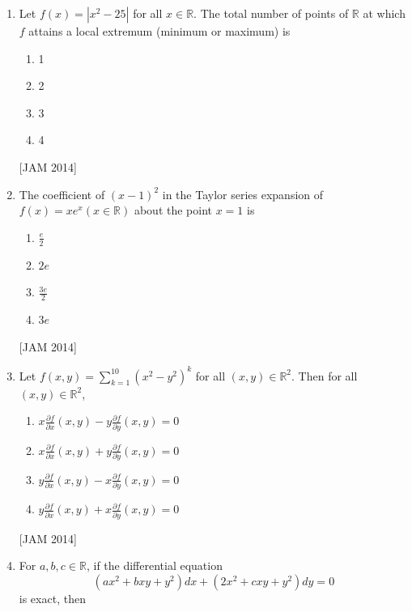 \begin{enumerate}



\item  Let $f(x)=\left|x^{2}-25\right|$ for all $x \in \mathbb{R}$. The total number of points of $\mathbb{R}$ at which $f$ attains a local extremum (minimum or maximum) is 

\begin{enumerate}
 \item 1 
\item 2 
\item 3 
\item 4

\end{enumerate}
\hfill [JAM 2014]


\item  The coefficient of $(x-1)^{2}$ in the Taylor series expansion of $f(x)=x e^{x}(x \in \mathbb{R})$ about the point $x=1$ is 

\begin{enumerate}
 \item $\frac{e}{2}$ 
\item $2 e$ 
\item $\frac{3 e}{2}$ 
\item $3 e$
\end{enumerate}
\hfill [JAM 2014]



\item  Let $f(x, y)=\sum_{k=1}^{10}\left(x^{2}-y^{2}\right)^{k}$ for all $(x, y) \in \mathbb{R}^{2}$. Then for all $(x, y) \in \mathbb{R}^{2}$, 

\begin{enumerate}
 \item $x \frac{\partial f}{\partial x}(x, y)-y \frac{\partial f}{\partial y}(x, y)=0$ 
\item $x \frac{\partial f}{\partial x}(x, y)+y \frac{\partial f}{\partial y}(x, y)=0$ 
\item $y \frac{\partial f}{\partial x}(x, y)-x \frac{\partial f}{\partial y}(x, y)=0$ 
\item $y \frac{\partial f}{\partial x}(x, y)+x \frac{\partial f}{\partial y}(x, y)=0$
\end{enumerate}
\hfill [JAM 2014]



\item  For $a, b, c \in \mathbb{R}$, if the differential equation
$$
\left(a x^{2}+b x y+y^{2}\right) d x+\left(2 x^{2}+c x y+y^{2}\right) d y=0
$$
is exact, then 


\end{enumerate}
